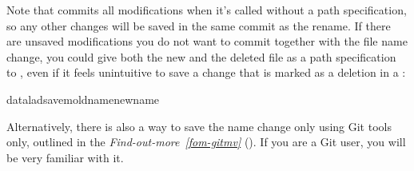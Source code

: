 \sphinxAtStartPar
Note that  commits all modifications when
it’s called without a path specification,
so any other changes will be saved in the same commit as the rename.
If there are unsaved modifications you do not want to commit
together with the file name change, you could give both the
new and the deleted file as a path specification to
, even if it feels unintuitive to
save a change that is marked as a deletion in a
:

\begin{sphinxVerbatim}[commandchars=\\\{\}]
dataladsave\PYGZhy{}moldnamenewname
\end{sphinxVerbatim}

\sphinxAtStartPar
Alternatively, there is also a way to save the name change
only using Git tools only, outlined in the \textit{Find-out-more}~{\findoutmoreiconinline}\textit{\ref{fom-gitmv}} {\hyperref[\detokenize{basics/101-136-filesystem:fom-gitmv}]{}} (). If you are a Git user, you will be very familiar with it.

